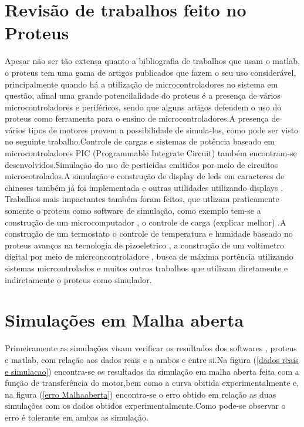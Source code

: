 \documentclass[11pt, a4paper, oneside]{article}
\begin{document}
\section{Revisão de trabalhos feito no Proteus}
Apesar não ser tão extensa quanto a bibliografia de trabalhos que usam o matlab, o proteus tem uma gama de artigos publicados que fazem o seu uso considerável, principalmente quando há a utilização de microcontroladores no sistema em questão, afinal uma grande potencilalidade do proteus é a presença de vários microcontroladores e periféricos, sendo que alguns artigos defendem o uso do proteus como ferramenta para o ensino de microcontroladores\cite{Ensino_proteus_uc}\cite{proteus_educacao}.A presença de vários tipos de motores provem a possibilidade de simula-los, como pode ser visto no seguinte trabalho\cite{motor_brushless}.Controle de cargas  e sistemas de potência baseado em microcontroladores PIC (Programmable Integrate Circuit) também encontram-se desenvolvidos\cite{busca_de_maxima_potencia_com_sistemas_microcontrolados}.Simulação do  uso de pesticidas emitidos por meio de circuitos microcotrolados\cite{pesticida}.A simulação e construção de display de leds em caracteres de chineses também já foi implementada \cite{caracteres_chineses}e outras utilidades utilizando displays \cite{simulacao_led_proteus_display}.\\
Trabalhos mais impactantes também foram feitos, que utlizam praticamente somente o proteus como software de simulação, como exemplo tem-se a construção de um microcomputador \cite{contrucao_microconputador_proteus}, o controle de carga (explicar melhor) \cite{controle_de_carga}.A construção de um termostato \cite{termostato} o controle de temperatura e humidade baseado no proteus \cite{controle_de_temperatura} avanços na tecnologia de pizoeletrico \cite{pizoeletrico}, a construção de um voltimetro digital por meio de micrconcontroladore \cite{voltimetro_digital}, busca de máxima portência utilizando sistemas micrcontrolados \cite{busca_de_maxima_potencia_com_sistemas_microcontrolados} e muitos outros trabalhos que utilizam diretamente e indiretamente o proteus como simulador.

\section{Simulações em Malha aberta}
Primeiramente as simulações visam verificar os resultados dos softwares , proteus e matlab, com relação aos dados reais e a ambos e entre si.Na figura (\ref{dados reais e simulacao}) encontra-se os resultados da simulação em malha aberta feita com a função de transferência do motor,bem como a curva obitida experimentalmente e, na figura (\ref{erro Malhaaberta}) encontra-se o erro obtido em relação as duas simulações com os dados obtidos experimentalmente.Como pode-se observar o erro é tolerante em ambas as simulação.
\end{document}
